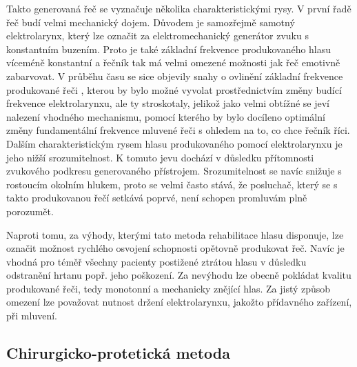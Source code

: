 
Takto generovaná řeč se vyznačuje několika charakteristickými rysy. V první
řadě řeč budí velmi mechanický dojem. Důvodem je samozřejmě samotný
elektrolarynx, který lze označit za elektromechanický generátor zvuku s
konstantním buzením. Proto je také základní frekvence produkovaného hlasu víceméně konstantní a řečník tak má velmi omezené možnosti jak řeč emotivně zabarvovat. V průběhu času se sice objevily snahy o ovlinění základní frekvence produkované řeči \cite{Kikuchi2004, Uemi1994, Goldstein2004}, kterou by bylo možné vyvolat prostřednictvím změny budící frekvence elektrolarynxu, ale ty stroskotaly, jelikož jako velmi obtížné se jeví nalezení vhodného mechanismu, pomocí kterého by bylo docíleno optimální změny fundamentální frekvence mluvené řeči s ohledem na to, co chce řečník říci. Dalším charakteristickým rysem hlasu produkovaného pomocí elektrolarynxu je jeho nižší srozumitelnost. K tomuto jevu dochází v důsledku přítomnosti zvukového podkresu generovaného přístrojem. Srozumitelnost se navíc snižuje s rostoucím okolním hlukem, proto se velmi často stává, že posluchač, který se s takto produkovanou řečí setkává poprvé, není schopen promluvám plně porozumět.

Naproti tomu, za výhody, kterými tato metoda rehabilitace hlasu disponuje, lze označit možnost rychlého
osvojení schopnosti opětovně produkovat řeč. Navíc je vhodná pro téměř všechny pacienty
postižené ztrátou hlasu v důsledku odstranění hrtanu popř. jeho poškození.
Za nevýhodu lze obecně pokládat kvalitu produkované řeči, tedy monotonní a
mechanicky znějící hlas. Za jistý způsob omezení lze považovat nutnost držení elektrolarynxu, jakožto přídavného zařízení, při mluvení.




\subsection{Chirurgicko-protetická metoda} %
\label{chap:cause:treatment:tracheo}

